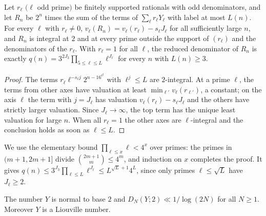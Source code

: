 \documentclass[11pt]{article}
\begin{document}
\begin{lemma}\label{lem:Yden}
Let $r_\ell$ $(\ell$ odd prime$)$ be finitely supported rationals with odd denominators, and let $R_n$ be
$2^n$ times the sum of the terms of $\sum_\ell r_\ell Y_\ell$ with label at most $L(n)$. For every $\ell$
with $r_\ell\ne0$, $v_\ell(R_n)=v_\ell(r_\ell)-s_\ell J_\ell$ for all sufficiently large $n$, and $R_n$ is
integral at $2$ and at every prime outside the support of $(r_\ell)$ and the denominators of the
$r_\ell$. With $r_\ell=1$ for all $\ell$, the reduced denominator of $R_n$ is exactly
$q(n)=3^{2J_3}\prod_{5\le\ell\le L}\ell^{J_\ell}$ for every $n$ with $L(n)\ge3$.
\end{lemma}

\begin{proof}
The terms $r_\ell\ell^{-s_\ell j}2^{n-16^{\ell^j}}$ with $\ell^j\le L$ are $2$-integral. At a prime $\ell$,
the terms from other axes have valuation at least $\min_{\ell'}v_\ell(r_{\ell'})$, a constant; on the axis
$\ell$ the term with $j=J_\ell$ has valuation $v_\ell(r_\ell)-s_\ell J_\ell$ and the others have strictly
larger valuation. Since $J_\ell\to\infty$, the top term has the unique least valuation for large $n$.
When all $r_\ell=1$ the other axes are $\ell$-integral and the conclusion holds as soon as $\ell\le L$.
\end{proof}

We use the elementary bound $\prod_{\ell\le x}\ell<4^x$ over primes: the primes in $(m+1,2m+1]$ divide
$\binom{2m+1}{m}\le4^m$, and induction on $x$ completes the proof. It gives
$q(n)\le3^{J_3}\prod_{\ell\le L}\ell^{J_\ell}\le L^{\sqrt L+1}4^L$, since only primes $\ell\le\sqrt L$
have $J_\ell\ge2$.

\begin{theorem}\label{thm:Y}
The number $Y$ is normal to base $2$ and $D_N(Y;2)\ll1/\log(2N)$ for all $N\ge1$. Moreover $Y$ is a
Liouville number.
\end{theorem}
\end{document}
